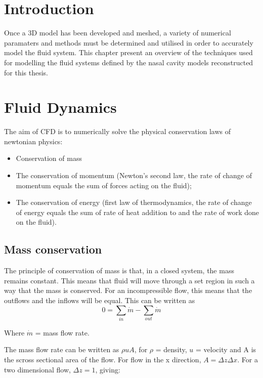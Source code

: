 \section{Introduction}
Once a 3D model has been developed and meshed, a variety of numerical paramaters and methods must be determined and utilised in order to accurately model the fluid system.
 This chapter present an overview of the techniques used for modelling the fluid systems defined by the nasal cavity models reconstructed for this thesis. 


\section{Fluid Dynamics}
The aim of CFD is to numerically solve the physical conservation laws of newtonian physics:

\begin{itemize}
  \item Conservation of mass

  \item The conservation of momentum (Newton’s second law, the rate of change of momentum equals the sum of forces acting on the fluid);

  \item The conservation of energy (first law of thermodynamics, the rate of change of energy equals the sum of rate of heat addition to and the rate of work done on the fluid).
 
\end{itemize}

    \subsection{Mass conservation}

    The principle of conservation of mass is that, in a closed system, the mass remains constant. This means that fluid will move through a set region in such a way that the mass is conserved. For an incompressible flow, this means that the outflows and the inflows will be equal. This can be written as
    \begin{equation} \label{eq:1}
      0 = \sum_{in} \dot{m} - \sum_{out} \dot{m}
    \end{equation} 

    Where $\dot{m}$ = mass flow rate.
    
    The mass flow rate can be written as $ \rho u A $,  for $\rho$ = density, $u$ = velocity and A is the scross sectional area of the flow. For flow in the x direction, $ A = \Delta z \Delta x $. For a two dimensional flow, $ \Delta z = 1 $, giving:

